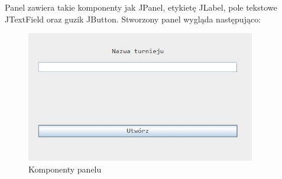 Panel zawiera takie komponenty jak JPanel, etykietę JLabel, pole tekstowe JTextField oraz guzik JButton. Stworzony panel wygląda następująco:
\begin{figure}[H]
	\centering
	\includegraphics[width=10cm]{fig/m2}
	\caption{Komponenty panelu}
	\label {fig:panel} 
\end{figure}

